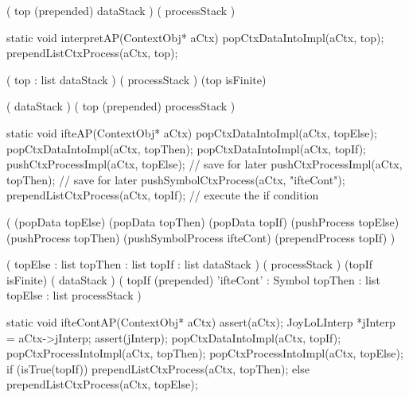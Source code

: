 \postDataStack
  (
    top (prepended)
    dataStack
  )
\postProcessStack
  (
    processStack
  )
\postConditions
\stopPostStack

\stopWord

\stoptyping

\startCCode
static void interpretAP(ContextObj* aCtx) {
  popCtxDataIntoImpl(aCtx, top);
  prependListCtxProcess(aCtx, top);
}
\stopCCode

\starttyping

\startWord[interpret]

\preDataStack
  (
    top : list
    dataStack
  )
\preProcessStack
  (
    processStack
  )
\preConditions
  (top isFinite)
\stopPreStack

\postDataStack
  (
    dataStack
  )
\postProcessStack
  (
    top (prepended)
    processStack
  )
\postConditions
\stopPostStack

\stopWord

\stoptyping

\startJoyLoLWord[ifte]

\startCCode
static void ifteAP(ContextObj* aCtx) {
  popCtxDataIntoImpl(aCtx, topElse);
  popCtxDataIntoImpl(aCtx, topThen);
  popCtxDataIntoImpl(aCtx, topIf);
  pushCtxProcessImpl(aCtx, topElse); // save for later
  pushCtxProcessImpl(aCtx, topThen); // save for later
  pushSymbolCtxProcess(aCtx, "ifteCont");
  prependListCtxProcess(aCtx, topIf); // execute the if condition
}
\stopCCode

\startImplementation[ansic]
  (
    (popData topElse)
    (popData topThen)
    (popData topIf)
    (pushProcess topElse)
    (pushProcess topThen)
    (pushSymbolProcess ifteCont)
    (prependProcess topIf)
  )
\stopImplementation

\startRule[ifte]
\preDataStack
  (
    topElse : list
    topThen : list
    topIf   : list
    dataStack
  )
\preProcessStack
  (
    processStack
  )
\preConditions
  (topIf isFinite)
\postDataStack
  (
    dataStack
  )
\postProcessStack
  (
    topIf (prepended)
    'ifteCont' : Symbol
    topThen    : list
    topElse    : list
    processStack
  )
\postConditions
\stopRule

\stopJoyLoLWord

\startJoyLoLWord[ifteCont]

\startCCode
static void ifteContAP(ContextObj* aCtx) {
  assert(aCtx);
  JoyLoLInterp *jInterp = aCtx->jInterp;
  assert(jInterp);
  popCtxDataIntoImpl(aCtx, topIf);
  popCtxProcessIntoImpl(aCtx, topThen);
  popCtxProcessIntoImpl(aCtx, topElse);
  if (isTrue(topIf)) {
    prependListCtxProcess(aCtx, topThen);
  } else {
    prependListCtxProcess(aCtx, topElse);
  }
}
\stopCCode

